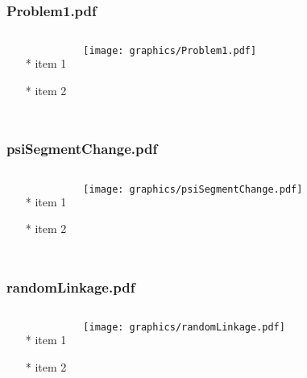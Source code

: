 \documentclass{beamer}
\begin{document}
\begin{frame} \frametitle{Problem1.pdf}
    \begin{columns}[c]
        \begin{itemize}
            \item[*] item 1
            \item[*] item 2
        \end{itemize}
        \begin{minipage}{\linewidth}
            \begin{center}
            \texttt{[image: graphics/Problem1.pdf]}
            \label{gfx:Problem1.pdf}
            \end{center}
        \end{minipage}
    \end{columns}
\end{frame}
\begin{frame} \frametitle{psiSegmentChange.pdf}
    \begin{columns}[c]
        \begin{itemize}
            \item[*] item 1
            \item[*] item 2
        \end{itemize}
        \begin{minipage}{\linewidth}
            \begin{center}
            \texttt{[image: graphics/psiSegmentChange.pdf]}
            \label{gfx:psiSegmentChange.pdf}
            \end{center}
        \end{minipage}
    \end{columns}
\end{frame}
\begin{frame} \frametitle{randomLinkage.pdf}
    \begin{columns}[c]
        \begin{itemize}
            \item[*] item 1
            \item[*] item 2
        \end{itemize}
        \begin{minipage}{\linewidth}
            \begin{center}
            \texttt{[image: graphics/randomLinkage.pdf]}
            \label{gfx:randomLinkage.pdf}
            \end{center}
        \end{minipage}
    \end{columns}
\end{frame}
\end{document}
